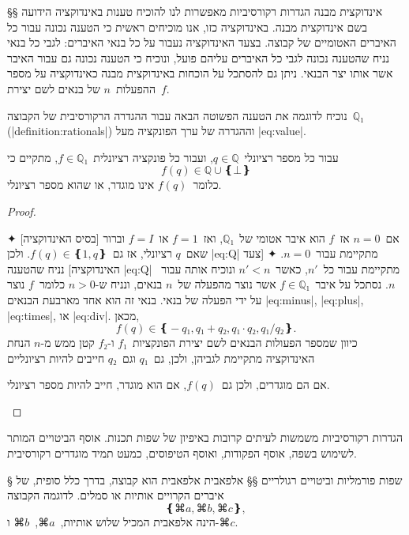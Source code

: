 §§ אינדוקצית מבנה
הגדרות רקורסיביות מאפשרות לנו להוכיח טענות באינדוקציה הידועה בשם אינדוקצית
מבנה. באינדוקציה כזו, אנו מוכיחים ראשית כי הטענה נכונה עבור כל האיברים האטומיים
של קבוצה. בצעד האינדוקציה נעבור על כל בנאי האיברים: לגבי כל בנאי נניח שהטענה
נכונה לגבי כל האיברים עליהם פועל, ונוכיח כי הטענה נכונה גם עבור האיבר אשר אותו
יצר הבנאי. ניתן גם להסתכל על הוכחות באינדוקצית מבנה כאינדוקציה על מספר
ההפעלות~$n$ של בנאים לשם יצירת~$f$.

נוכיח לדוגמה את הטענה הפשוטה הבאה עבור ההגדרה הרקורסיבית של הקבוצה~$ℚ₁$
(|definition:rationals|) וההגדרה של ערך הפונקציה מעל |eq:value|.

\begin{claim}
  עבור כל מספר רציונלי~$q∈ℚ$, ועבור כל פונקציה רציונלית~$f∈ℚ₁$, מתקיים כי
  \begin{equation}\label{eq:Q}
    f(q)∈ℚ∪❴⊥❵
  \end{equation}
  כלומר~$f(q)$ אינו מוגדר, או שהוא מספר רציונלי.
\end{claim}

\begin{proof}
  \mbox{}
  \begin{description}
    ✦ [בסיס האינדוקציה] אם~$n=0$ אז~$f$ הוא איבר אטומי של~$ℚ₁$,
    ואז~$f=1$ או~$f=I$ וברור שאם~$q$ רציונלי, אז גם~$f(q)∈❴1,q❵$. ולכן
    |eq:Q| מתקיימת עבור~$n=0$.
    ✦ [צעד האינדוקציה] נניח שהטענה |eq:Q| מתקיימת עבור כל~$n'$, כאשר~$n'<n$
    ונוכיח אותה עבור~$n$.
    נסתכל על איבר~$f∈ℚ₁$ אשר נוצר מהפעלה של~$n$ בנאים, ונניח ש-$n>0$ כלומר~$f$
    נוצר על ידי הפעלה של בנאי. בנאי זה הוא אחד מארבעת הבנאים |eq:minus|,
    |eq:plus|, |eq:times|, או |eq:div|.
    מכאן, \[
      f(q)∈❴-q₁,q₁+q₂,q₁·q₂,q₁/q₂❵.
\] כיוון שמספר הפעולות הבנאים לשם יצירת הפונקציות~$f₁$ ו-$f₂$ קטן ממש מ-$n$
    הנחת האינדוקציה מתקיימת לגביהן, ולכן, גם~$q₁$ וגם~$q₂$ חייבים להיות רציונליים

    אם הם מוגדרים, ולכן גם~$f(q)$,
    אם הוא מוגדר, חייב
    להיות מספר רציונלי.
  \end{description}
\end{proof}

הגדרות רקורסיביות משמשות לעיתים קרובות באיפיון של שפות תכנות. אוסף הביטויים
המותר לשימוש בשפה, אוסף הפקודות, ואוסף הטיפוסים, כמעט תמיד מוגדרים רקורסיבית.

§ שפות פורמליות וביטויים רגולריים
§§ אלפאבית
אלפאבית הוא קבוצה, בדרך כלל סופית, של איברים הקרויים אותיות או סמלים. לדוגמה
הקבוצה
\begin{equation*}
  ❴⌘a,⌘b,⌘c❵,
\end{equation*}
הינה אלפאבית המכיל שלוש אותיות,~$⌘a$,~$⌘b$ ו-$⌘c$.

